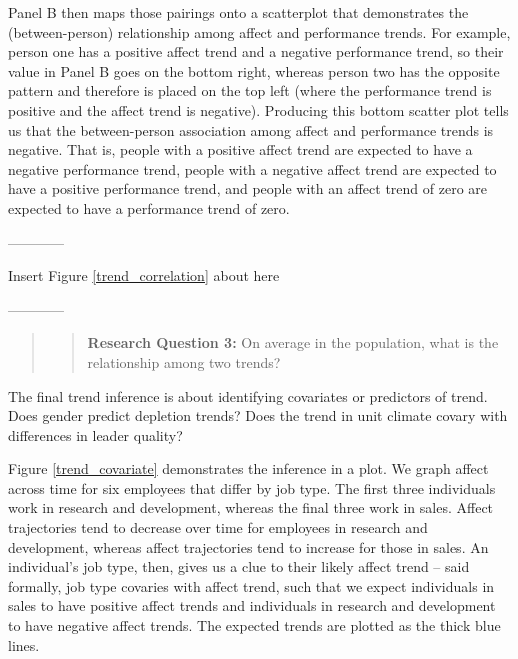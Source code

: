 \documentclass[english,,man]{apa6}
\theoremstyle{definition}
\theoremstyle{definition}
\theoremstyle{definition}
\theoremstyle{remark}
\begin{document}
Panel B then maps those pairings onto a scatterplot that demonstrates
the (between-person) relationship among affect and performance trends.
For example, person one has a positive affect trend and a negative
performance trend, so their value in Panel B goes on the bottom right,
whereas person two has the opposite pattern and therefore is placed on
the top left (where the performance trend is positive and the affect
trend is negative). Producing this bottom scatter plot tells us that the
between-person association among affect and performance trends is
negative. That is, people with a positive affect trend are expected to
have a negative performance trend, people with a negative affect trend
are expected to have a positive performance trend, and people with an
affect trend of zero are expected to have a performance trend of zero.

\begin{center}

------------

Insert Figure \ref{trend_correlation} about here

------------

\end{center}

\begin{quote}
\begin{quote}
\textbf{Research Question 3:} On average in the population, what is the
relationship among two trends?
\end{quote}
\end{quote}

The final trend inference is about identifying covariates or predictors
of trend. Does gender predict depletion trends? Does the trend in unit
climate covary with differences in leader quality?

Figure \ref{trend_covariate} demonstrates the inference in a plot. We
graph affect across time for six employees that differ by job type. The
first three individuals work in research and development, whereas the
final three work in sales. Affect trajectories tend to decrease over
time for employees in research and development, whereas affect
trajectories tend to increase for those in sales. An individual's job
type, then, gives us a clue to their likely affect trend -- said
formally, job type covaries with affect trend, such that we expect
individuals in sales to have positive affect trends and individuals in
research and development to have negative affect trends. The expected
trends are plotted as the thick blue lines.
\end{document}

